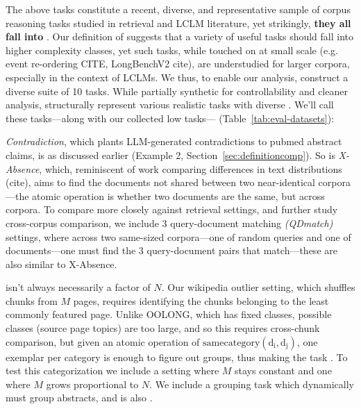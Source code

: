 The above tasks constitute a recent, diverse, and representative sample of corpus reasoning tasks studied in retrieval and LCLM literature, yet strikingly, \textbf{they all fall into }. Our definition of \cname suggests that a variety of useful tasks should fall into higher complexity classes, yet such tasks, while touched on at small scale (e.g. event re-ordering CITE, LongBenchV2 cite), are understudied for larger corpora, especially in the context of LCLMs. We thus, to enable our analysis, construct a diverse suite of 10 \cname tasks. While partially synthetic for controllability and cleaner analysis, \bench{} structurally represent various realistic tasks with diverse \cname{}.  We'll call these tasks---along with our collected low \cname tasks---\bench{} (Table~\ref{tab:eval-datasets}):

\emph{Contradiction}, which plants LLM-generated contradictions to pubmed abstract claims, is as discussed earlier  (Example 2, Section~\ref{sec:definitioncomp}). So is \emph{X-Absence}, which, reminiscent of work comparing differences in text distributions (cite), aims to find the documents not shared between two near-identical corpora---the atomic operation is whether two documents are the same, but across corpora. To compare more closely against retrieval settings, and further study cross-corpus comparison, we include 3 query-document matching \emph{(QDmatch)} settings, where across two same-sized corpora---one of random queries and one of documents---one must find the 3 query-document pairs that match---these are also  similar to X-Absence.

\cname isn't always necessarily a factor of $N$. Our wikipedia outlier setting, which shuffles chunks from $M$ pages, requires identifying the chunks belonging to the least commonly featured page. Unlike OOLONG, which has fixed classes, possible classes (source page topics) are too large, and so this requires cross-chunk comparison, but given an atomic operation of $\mathrm{samecategory(d_i, d_j)}$, one exemplar per category is enough to figure out groups, thus making the task . To test this categorization we include a setting where $M$ stays constant and one where $M$ grows proportional to $N$. We include a grouping task which dynamically must group abstracts, and is also .

